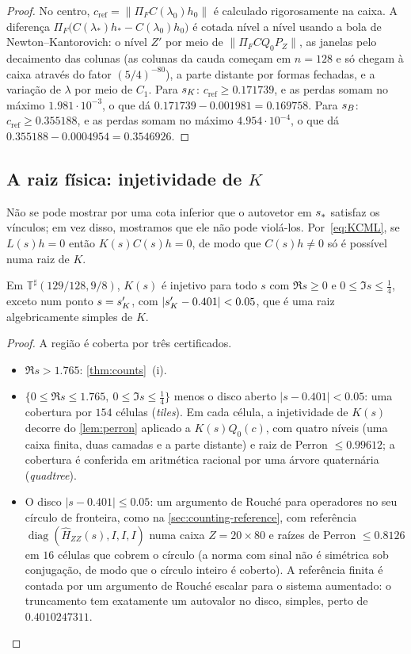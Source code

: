 \begin{proof}
No centro, $c_{\mathrm{ref}}=\|\Pi_FC(\lambda_0)h_0\|$ é calculado rigorosamente na caixa. A diferença
$\Pi_F\big(C(\lambda_*)h_*-C(\lambda_0)h_0\big)$ é cotada nível a nível usando a bola de Newton--Kantorovich:
o nível $Z'$ por meio de $\|\Pi_FCQ_0P_Z\|$, as janelas pelo decaimento das colunas (as colunas da cauda começam em
$n=128$ e só chegam à caixa através do fator $(5/4)^{-80}$), a parte distante por formas fechadas, e a variação
de $\lambda$ por meio de $C_1$. Para $s_{K}$: $c_{\mathrm{ref}}\ge0.171739$, e as perdas somam no máximo $1.981\cdot10^{-3}$, o que dá
$0.171739-0.001981=0.169758$. Para $s_{B}$: $c_{\mathrm{ref}}\ge0.355188$, e as perdas somam no máximo
$4.954\cdot10^{-4}$, o que dá $0.355188-0.0004954=0.3546926$.
\end{proof}

\subsection{A raiz física: injetividade de $K$}\label{sec:roots-K}

Não se pode mostrar por uma cota inferior que o autovetor em $s_{\ast}$ satisfaz os vínculos; em vez disso, mostramos que
ele não pode violá-los. Por~\eqref{eq:KCML}, se $L(s)h=0$ então $K(s)C(s)h=0$, de modo que $C(s)h\neq0$ só é possível numa
raiz de $K$.

\begin{proposition}[Injetividade de $K$]\label{prop:Kinj}
Em $\mathbb T^\sharp(129/128,9/8)$, $K(s)$ é injetivo para todo $s$ com $\Re s\ge0$ e $0\le\Im s\le\tfrac14$,
exceto num ponto $s=s_{K}'$, com $|s_{K}'-0.401|<0.05$, que é uma raiz algebricamente simples de $K$.
\end{proposition}

\begin{proof}
A região é coberta por três certificados.
\begin{itemize}[leftmargin=*]
\item $\Re s>1.765$: \cref{thm:counts}~(i).
\item $\{0\le\Re s\le1.765,\ 0\le\Im s\le\tfrac14\}$ menos o disco aberto $|s-0.401|<0.05$: uma cobertura por $154$
  células (\emph{tiles}). Em cada célula, a injetividade de $K(s)$ decorre do \cref{lem:perron} aplicado a $K(s)Q_0(c)$, com quatro
  níveis (uma caixa finita, duas camadas e a parte distante) e raiz de Perron $\le0.99612$; a cobertura é conferida em
  aritmética racional por uma árvore quaternária (\emph{quadtree}).
\item O disco $|s-0.401|\le0.05$: um argumento de Rouch\'e para operadores no seu círculo de fronteira, como na
  \cref{sec:counting-reference}, com referência $\operatorname{diag}(\widehat H_{ZZ}(s),I,I,I)$ numa caixa
  $Z=20\times80$ e raízes de Perron $\le0.8126$ em $16$ células que cobrem o círculo (a norma com sinal não é simétrica
  sob conjugação, de modo que o círculo inteiro é coberto). A referência finita é contada por um argumento de Rouch\'e
  escalar para o sistema aumentado: o truncamento tem exatamente um autovalor no disco, simples, perto de $0.4010247311$.
\end{itemize}
\end{proof}

